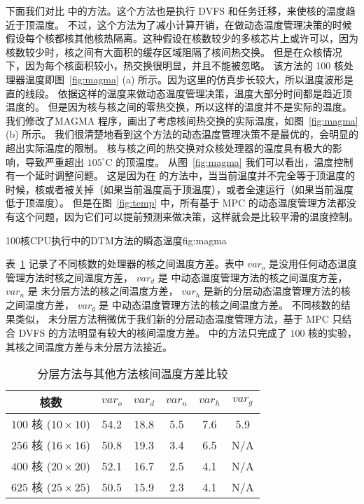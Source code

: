 下面我们对比 \cite{Hanumaiah:TCAD'11} 中的方法。这个方法也是执行 DVFS 和任务迁移，来使核的温度趋近于顶温度。
不过，这个方法为了减小计算开销，在做动态温度管理决策的时候假设每个核都核其他核热隔离。这种假设在核数较少的多核芯片上或许可以，因为核数较少时，核之间有大面积的缓存区域阻隔了核间热交换。
但是在众核情况下，因为每个核面积较小，热交换很明显，并且不能被忽略。
该方法的 100 核处理器温度即图~\ref{fig:magma} (a) 所示。因为这里的仿真步长较大，所以温度波形是直的线段。
依据这样的温度来做动态温度管理决策，温度大部分时间都是趋近顶温度的。
但是因为核与核之间的零热交换，所以这样的温度并不是实际的温度。
我们修改了MAGMA 程序，画出了考虑核间热交换的实际温度，如图~\ref{fig:magma} (b) 所示。
我们很清楚地看到这个方法的动态温度管理决策不是最优的，会明显的超出实际温度的限制。
核与核之间的热交换对众核处理器的温度具有极大的影响，导致严重超出 $105^{\circ}$C 的顶温度。
从图~\ref{fig:magma} 我们可以看出，温度控制有一个延时调整问题。
这是因为在 \cite{Hanumaiah:TCAD'11} 的方法中，当当前温度并不完全等于顶温度的时候，核或者被关掉（如果当前温度高于顶温度），或者全速运行（如果当前温度低于顶温度）。
但是在图~\ref{fig:temp} 中，所有基于 MPC 的动态温度管理方法都没有这个问题，因为它们可以提前预测来做决策，这样就会是比较平滑的温度控制。
\begin{pics}[H]{100核CPU执行\cite{Hanumaiah:TCAD'11}中的DTM方法的瞬态温度}{fig:magma}
 \end{pics}

 
表~\ref{tab:var} 记录了不同核数的处理器的核之间温度方差。表中 $var_o$ 是没用任何动态温度管理方法时核之间温度方差，
$var_d$ 是 \cite{Zanini:ECCTD'09} 中动态温度管理方法的核之间温度方差，
$var_n$ 是 未分层方法的核之间温度方差，
$var_h$ 是新的分层动态温度管理方法的核之间温度方差，
$var_g$ 是 \cite{Hanumaiah:TCAD'11} 中动态温度管理方法的核之间温度方差。
不同核数的结果类似， 未分层方法稍微优于我们新的分层动态温度管理方法，基于 MPC 只结合 DVFS 的方法明显有较大的核间温度方差。
\cite{Hanumaiah:TCAD'11} 中的方法只完成了 $100$ 核的实验，其核之间温度方差与未分层方法接近。

\begin{table}[H]
\centering
 \caption{分层方法与其他方法核间温度方差比较 \label{tab:var}}{
 \begin{tabular}{|c|c|c|c|c|c|}
 \hline
 \hline
 核数  & $var_o$ & $var_d$ & $var_n$ & $var_h$ & $var_g$ \\
 \hline 
 \hline
 $100$ 核 ($10 \times 10$) & 54.2 & 18.8 & 5.5 & 7.6 & 5.9\\

 \hline
 $256$ 核 ($16 \times 16$) & 50.8 & 19.3 & 3.4 & 6.5 & N/A\\
 \hline
 $400$ 核 ($20 \times 20$) & 52.1 & 16.7 & 2.5 & 4.1 & N/A\\
 \hline
 $625$ 核 ($25 \times 25$) & 50.5 & 15.9 & 2.3 & 4.1 & N/A\\
 \hline
 \hline
 \end{tabular}}
 \end{table}
 
